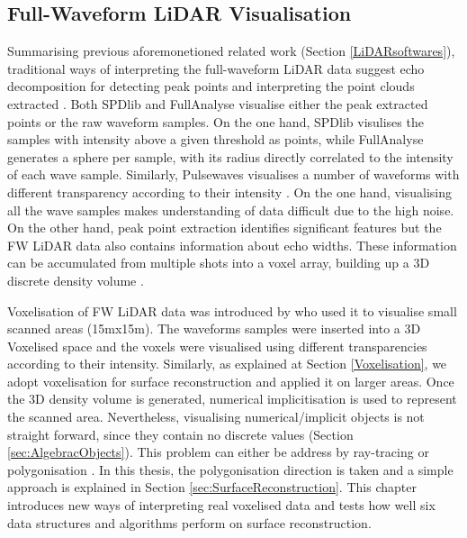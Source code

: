 \documentclass{subfiles}
\begin{document}
\subsection{Full-Waveform LiDAR Visualisation}

Summarising previous aforemonetioned related work (Section \ref{LiDARsoftwares}), traditional ways of interpreting the full-waveform LiDAR data suggest echo decomposition for detecting peak points and interpreting the point clouds extracted \cite{Wanger2006}. Both SPDlib \cite{Bunting2013} and FullAnalyse \cite{Chauve2009} visualise either the peak extracted points or the raw waveform samples. On the one hand, SPDlib visulises the samples with intensity above a given threshold as points, while FullAnalyse generates a sphere per sample, with its radius directly correlated to the intensity of each wave sample. Similarly, Pulsewaves visualises a number of waveforms with different transparency according to their intensity \cite{Isenburg2012Pulsewaves}. On the one hand, visualising all the wave samples makes understanding of data difficult due to the high noise. On the other hand, peak point extraction identifies significant features but the FW LiDAR data also contains information about echo widths. These information can be accumulated from multiple shots into a voxel array, building up a 3D discrete density volume \cite{Miltiadou2014}. 
\par Voxelisation of FW LiDAR data was introduced by \cite{Persson2005} who used it to visualise small scanned areas (15mx15m). The waveforms samples were inserted into a 3D Voxelised space and the voxels were visualised using different transparencies according to their intensity. Similarly, as explained at Section \ref{Voxelisation}, we adopt voxelisation for surface reconstruction and applied it on larger areas. Once the 3D density volume is generated, numerical implicitisation is used to represent the scanned area. Nevertheless, visualising numerical/implicit objects is not straight forward, since they contain no discrete values (Section \ref{sec:AlgebracObjects}). This problem can either be address by ray-tracing \cite{Hanrahan1983} or polygonisation \cite{Lorensen1987}. In this thesis, the polygonisation direction is taken and a simple approach is explained in Section \ref{sec:SurfaceReconstruction}. This chapter introduces new ways of interpreting real voxelised data and tests how well six data structures and algorithms perform on surface reconstruction.
\end{document}

